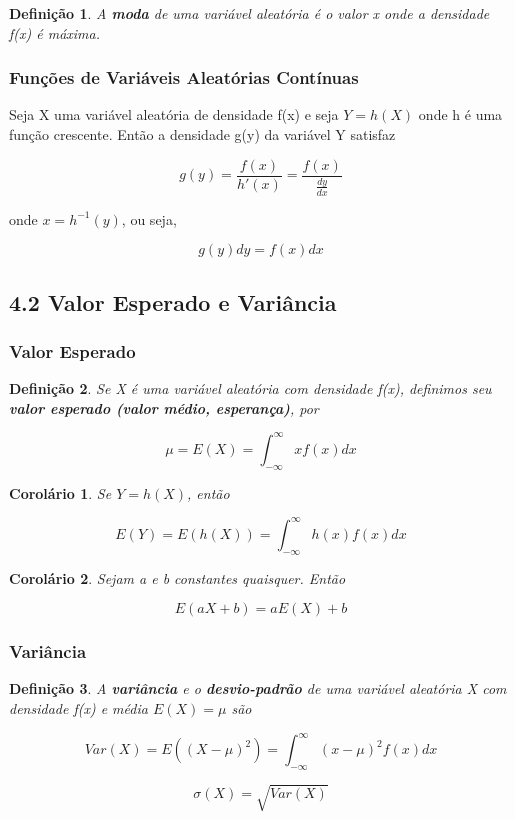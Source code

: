 \documentclass[12pt]{article}
\newtheorem{corollary}{Corolário}[theorem]
\newtheorem{definition}{Definição}
\begin{document}
\begin{definition}
    A \textbf{moda} de uma variável aleatória é o valor x onde a densidade f(x) é máxima.
\end{definition}

\subsubsection*{Funções de Variáveis Aleatórias Contínuas}

Seja X uma variável aleatória de densidade f(x) e seja $Y = h(X)$ onde h é uma função crescente. Então a densidade g(y) da variável Y satisfaz

$$g(y) = \dfrac{f(x)}{h'(x)} = \dfrac{f(x)}{\frac{d y}{d x}}$$

onde $x = h^{-1} (y)$, ou seja,

$$g(y) d y = f(x) d x$$

\subsection*{4.2 Valor Esperado e Variância}
\label{s19}

\subsubsection*{Valor Esperado}

\begin{definition}
    Se X é uma variável aleatória com densidade f(x), definimos seu \textbf{valor esperado (valor médio, esperança)}, por
    
    $$\mu = E(X) = \int_{- \infty}^{\infty} x f(x) d x$$
\end{definition}

\begin{corollary}
    Se $Y = h(X)$, então 
    
    $$E(Y) = E(h(X)) = \int_{- \infty}^{\infty} h(x) f(x) d x$$
\end{corollary}

\begin{corollary}
    Sejam a e b constantes quaisquer. Então
    
    $$E(a X + b) = a E(X) + b$$
\end{corollary}

\subsubsection*{Variância}

\begin{definition}
    A \textbf{variância} e o \textbf{desvio-padrão} de uma variável aleatória X com densidade f(x) e média $E(X) = \mu$ são
    
    $$Var(X) = E \left ((X - \mu)^2 \right ) = \int_{- \infty}^{\infty} (x - \mu)^2 f(x) d x$$
    
    $$\sigma(X) = \sqrt{Var (X)}$$
\end{definition}
\end{document}
